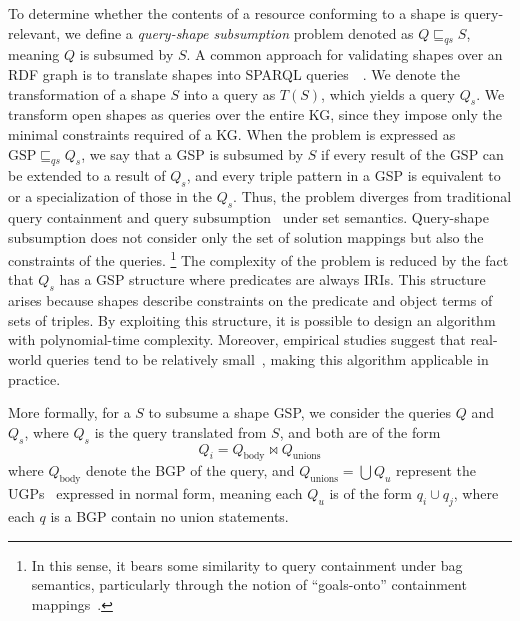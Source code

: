 To determine whether the contents of a resource conforming to a shape is query-relevant, we define a \emph{query-shape subsumption} problem denoted as $Q \sqsubseteq_{qs} S$, meaning $Q$ is subsumed by $S$.
A common approach for validating shapes over an \ac{RDF} graph is to translate shapes into SPARQL queries~~\cite{labragayo2017validatingdescribinglinkeddata, Corman2019, spapeExpressionConvert, delva2023}.
We denote the transformation of a shape $S$ into a query as $T(S)$, which yields a query $Q_s$.
We transform open shapes as queries over the entire \ac{KG}, since they impose only the minimal constraints required of a \ac{KG}.
When the problem is expressed as $\text{GSP} \sqsubseteq_{qs} Q_s$, we say that a \ac{GSP} is subsumed by $S$ if every result of the \ac{GSP} can be extended to a result of $Q_s$, and every triple pattern in a \ac{GSP} is equivalent to or a specialization of those in the $Q_s$.
Thus, the problem diverges from traditional query containment and query subsumption~\cite{Spasi2023, Pichler2014} under set semantics.
Query-shape subsumption does not consider only the set of solution mappings but also the constraints of the queries.
\footnote{In this sense, it bears some similarity to query containment under bag semantics, particularly through the notion of ``goals-onto'' containment mappings~\cite{Chaudhuri1993, Afrati2010}.}
The complexity of the problem is reduced by the fact that $Q_s$ has a \ac{GSP} structure where predicates are always \acp{IRI}.
This structure arises because shapes describe constraints on the predicate and object terms of sets of triples.
By exploiting this structure, it is possible to design an algorithm with polynomial-time complexity.
Moreover, empirical studies suggest that real-world queries tend to be relatively small~\cite{Doan2012, Bonifati2019}, making this algorithm applicable in practice.

More formally, for a $S$ to subsume a shape \ac{GSP}, we consider the queries $Q$ and $Q_s$, where $Q_s$ is the query translated from $S$, and both are of the form
$$
	Q_i = Q_{\text{body}} \bowtie Q_{\text{unions}}
$$
where $Q_{\text{body}}$ denote the \ac{BGP} of the query, and
$Q_{\text{unions}} = \bigcup Q_u$ represent the \acp{UGP}~\cite{w3SPARQLQuery} expressed in normal form, meaning
each $Q_u$ is of the form $q_i \cup q_j$, where each $q$ is a \ac{BGP} contain no union statements.

